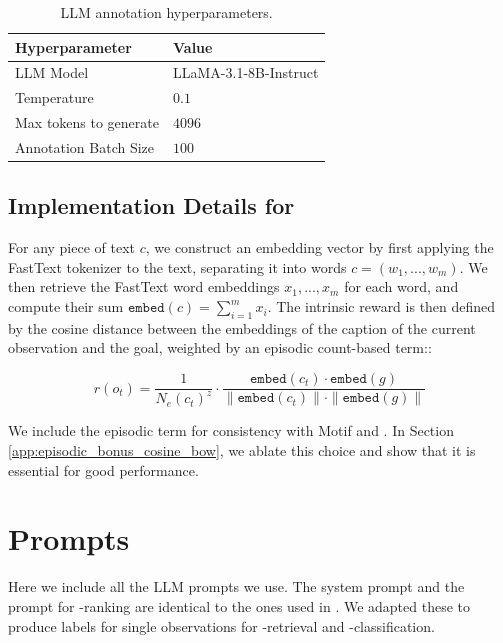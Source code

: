 \begin{table}[H]
    \centering
    \begin{tabular}{ll}
    Hyperparameter & Value \\
    \midrule
    LLM Model & LLaMA-3.1-8B-Instruct \\
    Temperature & $0.1$ \\
    Max tokens to generate & $4096$ \\
    Annotation Batch Size  & $100$ \\
    \end{tabular}
    \caption{LLM annotation hyperparameters.}
    \label{tab:llm-hps}
\end{table}



\subsection{Implementation Details for \ellmbow}
\label{app:ellm-details}

For any piece of text $c$, we construct an embedding vector by first applying the FastText tokenizer \cite{bojanowski2016enriching} to the text, separating it into words $c = (w_1, ..., w_m)$. We then retrieve the FastText word embeddings $x_1,...,x_m$ for each word, and compute their sum $\texttt{embed}(c) = \sum_{i=1}^m x_i$. The intrinsic reward is then defined by the cosine distance between the embeddings of the caption of the current observation and the goal, weighted by an episodic count-based term::

\begin{equation*}
    r(o_t) = \frac{1}{N_e(c_t)^z} \cdot \frac{\texttt{embed}(c_t) \cdot \texttt{embed}(g)}{\|\texttt{embed}(c_t)\| \cdot \|\texttt{embed}(g)\|}
\end{equation*}

We include the episodic term for consistency with Motif and \oni. In Section \ref{app:episodic_bonus_cosine_bow}, we ablate this choice and show that it is essential for good performance. 

\newpage
\section{Prompts}
\label{app:prompts}
Here we include all the LLM prompts we use. The system prompt and the prompt for \oni-ranking are identical to the ones used in \citet{klissarovdoro2023motif}. We adapted these to produce labels for single observations for \oni-retrieval and \oni-classification.   

